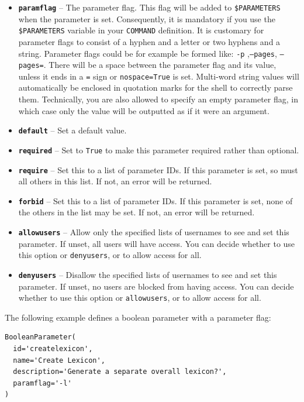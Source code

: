 \documentclass[a4paper,12pt]{report}
\begin{document}
\begin{itemize}
\item \textbf{\texttt{paramflag}} -- The parameter flag. This flag will be
  added to \texttt{\$PARAMETERS} when the parameter is set. Consequently, it is
  mandatory if you use the \texttt{\$PARAMETERS} variable in your
  \texttt{COMMAND} definition. It is customary for parameter flags to consist
  of a hyphen and a letter or two hyphens and a string. Parameter flags could
  be for example be formed like: \texttt{-p} ,\texttt{--pages},
  \texttt{--pages=}. There will be a space between the parameter flag and its
  value, unless it ends in a \texttt{=} sign or \texttt{nospace=True} is set.
  Multi-word string values will automatically be enclosed in quotation marks
  for the shell to correctly parse them. Technically, you are also allowed to
  specify an empty parameter flag, in which case only the value will be
  outputted as if it were an argument.
\item \textbf{\texttt{default}} -- Set a default value.
\item \textbf{\texttt{required}} -- Set to \texttt{True} to make this parameter required rather than optional.
\item \textbf{\texttt{require}} -- Set this to a list of parameter IDs. If this parameter is set, so must all others in this list. If not, an error will be returned.
\item \textbf{\texttt{forbid}} -- Set this to a list of parameter IDs. If this parameter is set, none of the others in the list may be set.  If not, an error will be returned.
\item \textbf{\texttt{allowusers}} -- Allow only the specified lists of usernames to see and set this parameter. If unset, all users will have access. You can decide whether to use this option or \texttt{denyusers}, or to allow access for all.
\item \textbf{\texttt{denyusers}} -- Disallow the specified lists of usernames to see and set this parameter. If unset, no users are blocked from having access. You can decide whether to use this option or \texttt{allowusers}, or to allow access for all.
\end{itemize}

The following example defines a boolean parameter with a parameter flag:

{\footnotesize{
\begin{verbatim}
BooleanParameter(
  id='createlexicon',
  name='Create Lexicon',
  description='Generate a separate overall lexicon?',
  paramflag='-l'
)
\end{verbatim}
}}
\end{document}
